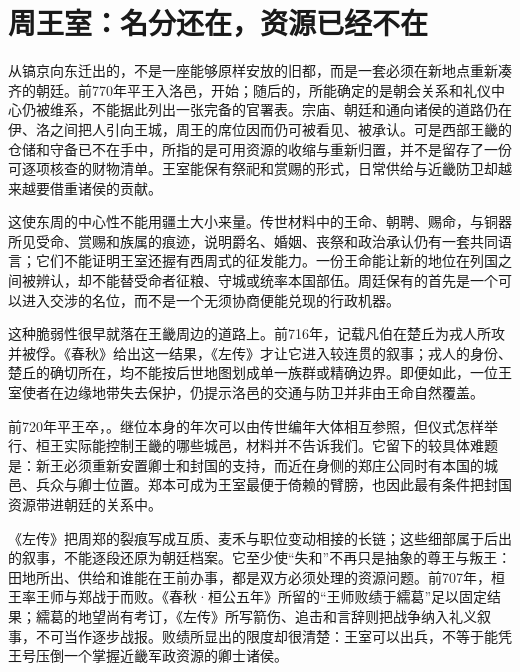 \section{周王室：名分还在，资源已经不在}

从镐京向东迁出的，不是一座能够原样安放的旧都，而是一套必须在新地点重新凑齐的朝廷。前770年平王入洛邑，开始；随后的，所能确定的是朝会关系和礼仪中心仍被维系，不能据此列出一张完备的官署表。宗庙、朝廷和通向诸侯的道路仍在伊、洛之间把人引向王城，周王的席位因而仍可被看见、被承认。可是西部王畿的仓储和守备已不在手中，所指的是可用资源的收缩与重新归置，并不是留存了一份可逐项核查的财物清单。王室能保有祭祀和赏赐的形式，日常供给与近畿防卫却越来越要借重诸侯的贡献。

这使东周的中心性不能用疆土大小来量。传世材料中的王命、朝聘、赐命，与铜器所见受命、赏赐和族属的痕迹，说明爵名、婚姻、丧祭和政治承认仍有一套共同语言；它们不能证明王室还握有西周式的征发能力。一份王命能让新的地位在列国之间被辨认，却不能替受命者征粮、守城或统率本国部伍。周廷保有的首先是一个可以进入交涉的名位，而不是一个无须协商便能兑现的行政机器。

这种脆弱性很早就落在王畿周边的道路上。前716年，记载凡伯在楚丘为戎人所攻并被俘。《春秋》给出这一结果，《左传》才让它进入较连贯的叙事；戎人的身份、楚丘的确切所在，均不能按后世地图划成单一族群或精确边界。即便如此，一位王室使者在边缘地带失去保护，仍提示洛邑的交通与防卫并非由王命自然覆盖。

前720年平王卒，。继位本身的年次可以由传世编年大体相互参照，但仪式怎样举行、桓王实际能控制王畿的哪些城邑，材料并不告诉我们。它留下的较具体难题是：新王必须重新安置卿士和封国的支持，而近在身侧的郑庄公同时有本国的城邑、兵众与卿士位置。郑本可成为王室最便于倚赖的臂膀，也因此最有条件把封国资源带进朝廷的关系中。

《左传》把周郑的裂痕写成互质、麦禾与职位变动相接的长链；这些细部属于后出的叙事，不能逐段还原为朝廷档案。它至少使“失和”不再只是抽象的尊王与叛王：田地所出、供给和谁能在王前办事，都是双方必须处理的资源问题。前707年，桓王率王师与郑战于而败。《春秋·桓公五年》所留的“王师败绩于繻葛”足以固定结果；繻葛的地望尚有考订，《左传》所写箭伤、追击和言辞则把战争纳入礼义叙事，不可当作逐步战报。败绩所显出的限度却很清楚：王室可以出兵，不等于能凭王号压倒一个掌握近畿军政资源的卿士诸侯。

